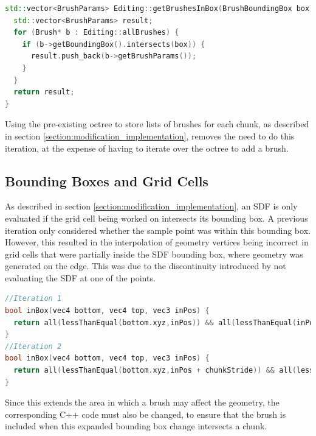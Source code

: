 \documentclass[11pt]{article}
\begin{document}
\begin{lstlisting}[language=C++,label={edit_storage_1},caption={Iteration over every brush, returning those that intersect the bounding box of the chunk.}]
std::vector<BrushParams> Editing::getBrushesInBox(BrushBoundingBox box) {
  std::vector<BrushParams> result;
  for (Brush* b : Editing::allBrushes) {
    if (b->getBoundingBox().intersects(box)) {
      result.push_back(b->getBrushParams());
    }
  }
  return result;
}
\end{lstlisting}

Using the pre-existing octree to store lists of brushes for each chunk, as described in section \ref{section:modification_implementation}, removes the need to do this iteration, at the expense of having to iterate over the octree to add a brush.

\subsection{Bounding Boxes and Grid Cells}
As described in section \ref{section:modification_implementation}, an SDF is only evaluated if the grid cell being worked on intersects its bounding box. A previous iteration only considered whether the sample point was within this bounding box. However, this resulted in the interpolation of geometry vertices being incorrect in grid cells that were partially inside the SDF bounding box, where geometry was generated on the edge. This was due to the discontinuity introduced by not evaluating the SDF at one of the points. 

\begin{lstlisting}[language=C++,label={bb_gc},caption={The first iteration of the test of a grid cell point against an SDF bounding box defined by \texttt{bottom} and \texttt{top}, followed by the second iteration, which includes the value \texttt{chunkStride} to ensure that the SDF is considered if the sample point is within 1 grid cell of the bounding box.}]
//Iteration 1
bool inBox(vec4 bottom, vec4 top, vec3 inPos) {
  return all(lessThanEqual(bottom.xyz,inPos)) && all(lessThanEqual(inPos,top.xyz));
}
//Iteration 2
bool inBox(vec4 bottom, vec4 top, vec3 inPos) {
  return all(lessThanEqual(bottom.xyz,inPos + chunkStride)) && all(lessThanEqual(inPos - chunkStride,top.xyz));
}
\end{lstlisting}

Since this extends the area in which a brush may affect the geometry, the corresponding C++ code must also be changed, to ensure that the brush is included when this expanded bounding box change intersects a chunk.
  
\end{document}
